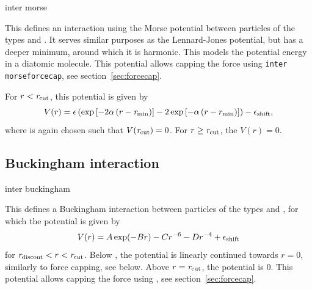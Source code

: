 \begin{essyntax}
  inter   morse
  \var{\epsilon} \var{\alpha}  
  \begin{features}
  \end{features}
\end{essyntax}
This defines an interaction using the Morse potential between particles of the
types  and . It serves similar purposes as the
Lennard-Jones potential, but has a deeper minimum, around which it is harmonic.
This models the potential energy in a diatomic molecule.  This potential allows
capping the force using {\tt inter morseforcecap}, see
section~\ref{sec:forcecap}.

For $r < \mathrm{\mathit{r_\mathrm{cut}}}$, this potential is given by
\begin{equation}
  V(r)=\mathrm{\mathit{\epsilon}}\left(\exp\left[-2 \mathrm{\mathit{\alpha}} \left(r - \mathrm{\mathit{r_\mathrm{min}}}\right)\right]
    - 2\exp\left[-\alpha\left(r - r_\mathrm{min}\right)\right]\right) -
  \epsilon_\mathrm{shift},
\end{equation}
where  is again chosen such that
$V(\mathrm{\mathit{r_\mathrm{cut}}})=0$. For $r\ge \mathrm{\mathit{r_\mathrm{cut}}}$, the $V(r)=0$.

\subsection{Buckingham interaction}

\begin{essyntax}
  inter   buckingham
     
    
  \begin{features}
  \end{features}
\end{essyntax}
This defines a Buckingham interaction between particles of the types
 and , for which the potential is given by
\begin{equation}
  V(r)= A\exp(-B r) - Cr^{-6} - Dr^{-4} + \mathrm{\mathit{\epsilon_\mathrm{shift}}}
\end{equation}
for $\mathrm{\mathit{r_\mathrm{discont}}} < r < \mathrm{\mathit{r_\mathrm{cut}}}$. Below ,
the potential is linearly continued towards $r=0$, similarly to force capping,
see below. Above $r=\mathrm{\mathit{r_\mathrm{cut}}}$, the potential is $0$. This potential
allows capping the force using , see
section~\ref{sec:forcecap}.

